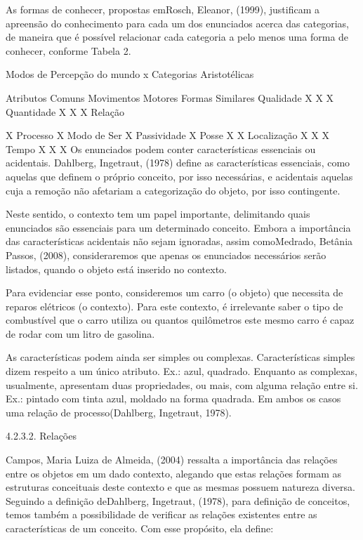 As formas de conhecer, propostas emRosch, Eleanor, (1999), justificam a apreensão do conhecimento para cada um dos enunciados acerca das categorias, de maneira que é possível relacionar cada categoria a pelo menos uma forma de conhecer, conforme Tabela 2.

Modos de Percepção do mundo x Categorias Aristotélicas

Atributos Comuns	Movimentos Motores	Formas Similares
Qualidade	X	X	X
Quantidade	X	X	X
Relação	

X
Processo	
X	
Modo de Ser	
X	
Passividade	
X	
Posse	
X	X
Localização	X	X	X
Tempo	X	X	X
Os enunciados podem conter características essenciais ou acidentais. Dahlberg, Ingetraut, (1978) define as características essenciais, como aquelas que definem o próprio conceito, por isso necessárias, e acidentais aquelas cuja a remoção não afetariam a categorização do objeto, por isso contingente.

Neste sentido, o contexto tem um papel importante, delimitando quais enunciados são essenciais para um determinado conceito. Embora a importância das características acidentais não sejam ignoradas, assim comoMedrado, Betânia Passos, (2008), consideraremos que apenas os enunciados necessários serão listados, quando o objeto está inserido no contexto.

Para evidenciar esse ponto, consideremos um carro (o objeto) que necessita de reparos elétricos (o contexto). Para este contexto, é irrelevante saber o tipo de combustível que o carro utiliza ou quantos quilômetros este mesmo carro é capaz de rodar com um litro de gasolina.

As características podem ainda ser simples ou complexas. Características simples dizem respeito a um único atributo. Ex.: azul, quadrado. Enquanto as complexas, usualmente, apresentam duas propriedades, ou mais, com alguma relação entre si. Ex.: pintado com tinta azul, moldado na forma quadrada. Em ambos os casos uma relação de processo(Dahlberg, Ingetraut, 1978).

4.2.3.2. Relações

Campos, Maria Luiza de Almeida, (2004) ressalta a importância das relações entre os objetos em um dado contexto, alegando que estas relações formam as estruturas conceituais deste contexto e que as mesmas possuem natureza diversa. Seguindo a definição deDahlberg, Ingetraut, (1978), para definição de conceitos, temos também a possibilidade de verificar as relações existentes entre as características de um conceito. Com esse propósito, ela define:

